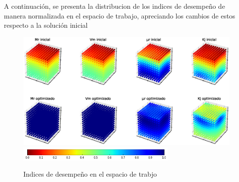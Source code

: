 A continuación, se presenta la distribucion de los indices de desempeño de manera normalizada en el espacio de trabajo, apreciando los cambios de estos respecto a la solución inicial
\begin{figure}[ht!]
    \centering
    \includegraphics[height = 0.4\textheight,width=1\textwidth]{Cap4_DisenoBasico/Figura/Ga/Indices.eps}
     \includegraphics[height = 0.04\textheight,width=0.7\textwidth]{Cap4_DisenoBasico/Figura/Ga/Colorbar.png}
    \caption{Indices de desempeño en el espacio de trabjo}
    \label{fig:optimization}
\end{figure}